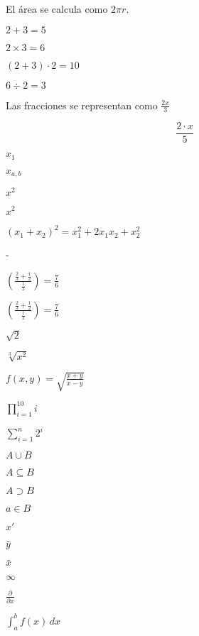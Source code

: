 \documentclass{article}
\begin{document}
El \'area se calcula como $2 \pi r$.

$2 + 3 = 5$

$2 \times 3 = 6$

$(2+3) \cdot 2 = 10$

$6 \div 2 = 3$

Las fracciones se representan como $\frac{2x}{3}$

\begin{equation}
\frac{2 \cdot x}{5}
\end{equation}

$x_1$

$x_{a,b}$

$x^2$

$x^{2}$

$(x_{1}+x_{2})^2=x_{1}^{2}+2x_{1}x_{2}+x_{2}^{2}$

-

$(\frac{\frac{2}{3}+\frac{1}{2}}{\frac{1}{2}})=\frac{7}{6}$

$\left(\frac{\frac{2}{3}+\frac{1}{2}}{\frac{1}{2}}\right)=\frac{7}{6}$

$\sqrt{2}$

$\sqrt[3]{x^{2}}$

$f(x,y)=\sqrt{\frac{x+y}{x-y}}$

$\prod_{i=1}^{10}{i}$

$\sum_{i=1}^{n}{2^i}$

$A \cup B $

$A \subseteq B$

$A \supset B$

$a \in B$

${x}'$

$\hat{y}$

$\bar{x}$

$\infty$

$\frac{\partial }{\partial x}$

$\int_{a}^{b} \! f(x)  \,dx$
\end{document}
